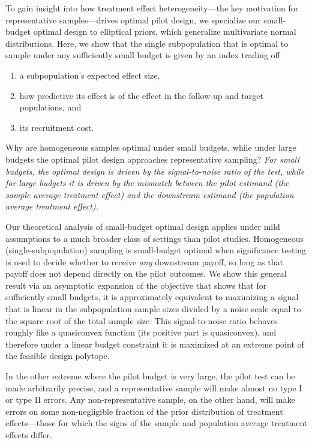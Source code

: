To gain insight into how treatment effect heterogeneity---the key motivation for representative samples---drives optimal pilot design, we specialize our small-budget optimal design to elliptical priors, which generalize multivariate normal distributions.
Here, we show that the single subpopulation that is optimal to sample under any sufficiently small budget is given by an index trading off
\begin{enumerate}[label=(\roman*)]
  \item a subpopulation's expected effect size,
  \item how predictive its effect is of the effect in the follow-up and target populations, and
  \item its recruitment cost.
\end{enumerate}

Why are homogeneous samples optimal under small budgets, while under large budgets the optimal pilot design approaches representative sampling?
\emph{For small budgets, the optimal design is driven by the signal-to-noise ratio of the test, while for large budgets it is driven by the mismatch between the pilot estimand (the sample average treatment effect) and the downstream estimand (the population average treatment effect).}

Our theoretical analysis of small-budget optimal design applies under mild assumptions to a much broader class of settings than pilot studies.
Homogeneous (single-subpopulation) sampling is small-budget optimal when significance testing is used to decide whether to receive \emph{any} downstream payoff, so long as that payoff does not depend directly on the pilot outcomes.
We show this general result via an asymptotic expansion of the objective that shows that for sufficiently small budgets, it is approximately equivalent to maximizing a signal that is linear in the subpopulation sample sizes divided by a noise scale equal to the square root of the total sample size.
This signal-to-noise ratio behaves roughly like a quasiconvex function (its positive part is quasiconvex), and therefore under a linear budget constraint it is maximized at an extreme point of the feasible design polytope.

In the other extreme where the pilot budget is very large, the pilot test can be made arbitrarily precise, and a representative sample will make almost no type I or type II errors.
Any non-representative sample, on the other hand, will make errors on some non-negligible fraction of the prior distribution of treatment effects---those for which the signs of the sample and population average treatment effects differ.

